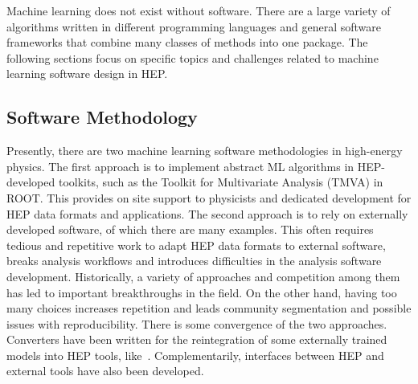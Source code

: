 
Machine learning does not exist without software. There are a large variety of algorithms written in different programming languages and general software frameworks that combine many classes of methods into one package. The following sections focus on specific topics and challenges related to machine learning software design in HEP.



\subsection{Software Methodology}
Presently, there are two machine learning software methodologies in high-energy physics. The first approach is to implement abstract ML algorithms in HEP-developed toolkits, such as the Toolkit for Multivariate Analysis (TMVA) in ROOT. This provides on site support to physicists and dedicated development for HEP data formats and applications. The second approach is to rely on externally developed software, of which there are many examples. This often requires tedious and repetitive work to adapt HEP data formats to external software, breaks analysis workflows and introduces difficulties in the analysis software development. Historically, a variety of approaches and competition among them has led to important breakthroughs in the field. On the other hand, having too many choices increases repetition and leads community segmentation and possible issues with reproducibility.
There is some convergence of the two approaches. Converters have been written for the reintegration of some externally trained models into HEP tools, like~\cite{lwtnn}. Complementarily, interfaces between HEP and external tools have also been developed.%

